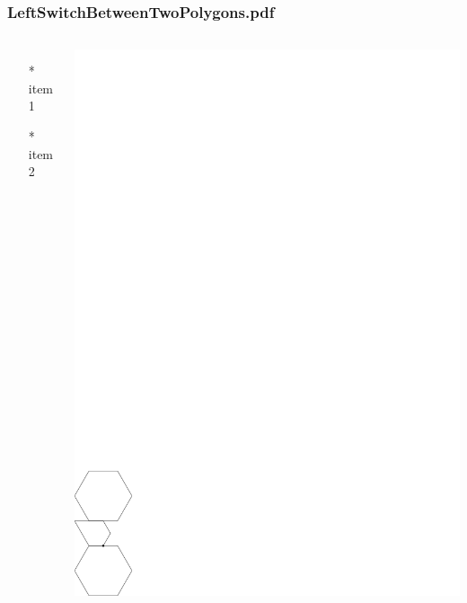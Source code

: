 \begin{frame} \frametitle{LeftSwitchBetweenTwoPolygons.pdf}
    \begin{columns}[c]
        \begin{itemize}
            \item[*] item 1
            \item[*] item 2
        \end{itemize}
        \begin{minipage}{\linewidth}
            \begin{center}
            \includegraphics[width=.9\textwidth]{graphics/LeftSwitchBetweenTwoPolygons.pdf}
            \label{gfx:LeftSwitchBetweenTwoPolygons.pdf}
            \end{center}
        \end{minipage}
    \end{columns}
\end{frame}
